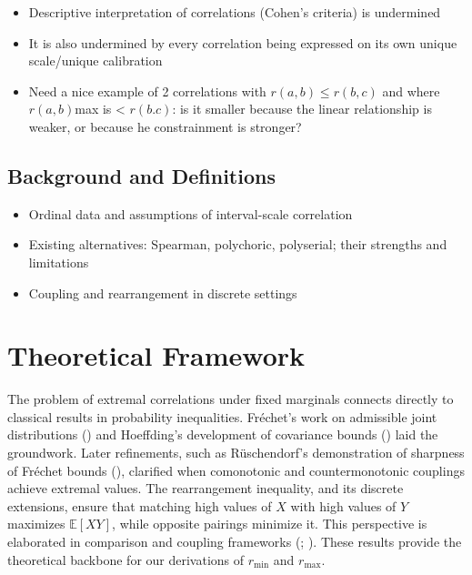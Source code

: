 \documentclass[
  12pt,
]{article}
\providecommand{\tightlist}{%
  \setlength{\itemsep}{0pt}\setlength{\parskip}{0pt}}
\theoremstyle{plain}
\theoremstyle{definition}
\theoremstyle{remark}
\begin{document}
\begin{itemize}
\tightlist
\item
  Descriptive interpretation of correlations (Cohen's criteria) is
  undermined
\item
  It is also undermined by every correlation being expressed on its own
  unique scale/unique calibration
\item
  Need a nice example of 2 correlations with \(r(a,b) \le r(b,c)\) and
  where \(r(a,b)\)max is \textless{} \(r(b.c)\): is it smaller because
  the linear relationship is weaker, or because he constrainment is
  stronger?
\end{itemize}

\subsection{Background and
Definitions}\label{background-and-definitions}

\begin{itemize}
\tightlist
\item
  Ordinal data and assumptions of interval-scale correlation\\
\item
  Existing alternatives: Spearman, polychoric, polyserial; their
  strengths and limitations\\
\item
  Coupling and rearrangement in discrete settings
\end{itemize}

\section{Theoretical Framework}\label{theoretical-framework}

The problem of extremal correlations under fixed marginals connects directly to classical results in probability inequalities. Fréchet’s work on admissible joint distributions (\autocite{frech51-sur}) and Hoeffding’s development of covariance bounds (\autocite{hoef40-massta}) laid the groundwork. Later refinements, such as Rüschendorf’s demonstration of sharpness of Fréchet bounds (\autocite{rues81-sharpn}), clarified when comonotonic and countermonotonic couplings achieve extremal values. The rearrangement inequality, and its discrete extensions, ensure that matching high values of \( X \) with high values of \( Y \) maximizes \(\mathbb{E}[XY]\), while opposite pairings minimize it. This perspective is elaborated in comparison and coupling frameworks (\autocite{muel02-compa}; \autocite{thor00-coupli}). These results provide the theoretical backbone for our derivations of \(r_{\min}\) and \(r_{\max}\).
\end{document}
